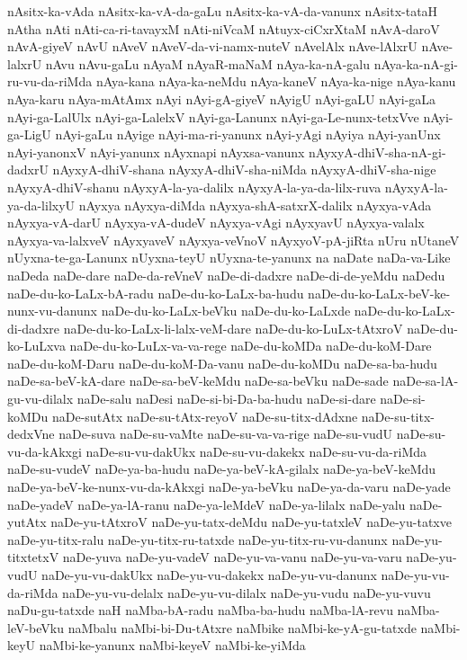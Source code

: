 {nAsitx-ka-vAda
nAsitx-ka-vA-da-gaLu
nAsitx-ka-vA-da-vanunx
nAsitx-tataH
nAtha
nAti
nAti-ca-ri-tavayxM
nAti-niVcaM
nAtuyx-ciCxrXtaM
nAvA-daroV
nAvA-giyeV
nAvU
nAveV
nAveV-da-vi-namx-nuteV
nAvelAlx
nAve-lAlxrU
nAve-lalxrU
nAvu
nAvu-gaLu
nAyaM
nAyaR-maNaM
nAya-ka-nA-galu
nAya-ka-nA-gi-ru-vu-da-riMda
nAya-kana
nAya-ka-neMdu
nAya-kaneV
nAya-ka-nige
nAya-kanu
nAya-karu
nAya-mAtAmx
nAyi
nAyi-gA-giyeV
nAyigU
nAyi-gaLU
nAyi-gaLa
nAyi-ga-LalUlx
nAyi-ga-LalelxV
nAyi-ga-Lanunx
nAyi-ga-Le-nunx-tetxVve
nAyi-ga-LigU
nAyi-gaLu
nAyige
nAyi-ma-ri-yanunx
nAyi-yAgi
nAyiya
nAyi-yanUnx
nAyi-yanonxV
nAyi-yanunx
nAyxnapi
nAyxsa-vanunx
nAyxyA-dhiV-sha-nA-gi-dadxrU
nAyxyA-dhiV-shana
nAyxyA-dhiV-sha-niMda
nAyxyA-dhiV-sha-nige
nAyxyA-dhiV-shanu
nAyxyA-la-ya-dalilx
nAyxyA-la-ya-da-lilx-ruva
nAyxyA-la-ya-da-lilxyU
nAyxya
nAyxya-diMda
nAyxya-shA-satxrX-dalilx
nAyxya-vAda
nAyxya-vA-darU
nAyxya-vA-dudeV
nAyxya-vAgi
nAyxyavU
nAyxya-valalx
nAyxya-va-lalxveV
nAyxyaveV
nAyxya-veVnoV
nAyxyoV-pA-jiRta
nUru
nUtaneV
nUyxna-te-ga-Lanunx
nUyxna-teyU
nUyxna-te-yanunx
na
naDate
naDa-va-Like
naDeda
naDe-dare
naDe-da-reVneV
naDe-di-dadxre
naDe-di-de-yeMdu
naDedu
naDe-du-ko-LaLx-bA-radu
naDe-du-ko-LaLx-ba-hudu
naDe-du-ko-LaLx-beV-ke-nunx-vu-danunx
naDe-du-ko-LaLx-beVku
naDe-du-ko-LaLxde
naDe-du-ko-LaLx-di-dadxre
naDe-du-ko-LaLx-li-lalx-veM-dare
naDe-du-ko-LuLx-tAtxroV
naDe-du-ko-LuLxva
naDe-du-ko-LuLx-va-va-rege
naDe-du-koMDa
naDe-du-koM-Dare
naDe-du-koM-Daru
naDe-du-koM-Da-vanu
naDe-du-koMDu
naDe-sa-ba-hudu
naDe-sa-beV-kA-dare
naDe-sa-beV-keMdu
naDe-sa-beVku
naDe-sade
naDe-sa-lA-gu-vu-dilalx
naDe-salu
naDesi
naDe-si-bi-Da-ba-hudu
naDe-si-dare
naDe-si-koMDu
naDe-sutAtx
naDe-su-tAtx-reyoV
naDe-su-titx-dAdxne
naDe-su-titx-dedxVne
naDe-suva
naDe-su-vaMte
naDe-su-va-va-rige
naDe-su-vudU
naDe-su-vu-da-kAkxgi
naDe-su-vu-dakUkx
naDe-su-vu-dakekx
naDe-su-vu-da-riMda
naDe-su-vudeV
naDe-ya-ba-hudu
naDe-ya-beV-kA-gilalx
naDe-ya-beV-keMdu
naDe-ya-beV-ke-nunx-vu-da-kAkxgi
naDe-ya-beVku
naDe-ya-da-varu
naDe-yade
naDe-yadeV
naDe-ya-lA-ranu
naDe-ya-leMdeV
naDe-ya-lilalx
naDe-yalu
naDe-yutAtx
naDe-yu-tAtxroV
naDe-yu-tatx-deMdu
naDe-yu-tatxleV
naDe-yu-tatxve
naDe-yu-titx-ralu
naDe-yu-titx-ru-tatxde
naDe-yu-titx-ru-vu-danunx
naDe-yu-titxtetxV
naDe-yuva
naDe-yu-vadeV
naDe-yu-va-vanu
naDe-yu-va-varu
naDe-yu-vudU
naDe-yu-vu-dakUkx
naDe-yu-vu-dakekx
naDe-yu-vu-danunx
naDe-yu-vu-da-riMda
naDe-yu-vu-delalx
naDe-yu-vu-dilalx
naDe-yu-vudu
naDe-yu-vuvu
naDu-gu-tatxde
naH
naMba-bA-radu
naMba-ba-hudu
naMba-lA-revu
naMba-leV-beVku
naMbalu
naMbi-bi-Du-tAtxre
naMbike
naMbi-ke-yA-gu-tatxde
naMbi-keyU
naMbi-ke-yanunx
naMbi-keyeV
naMbi-ke-yiMda
}
